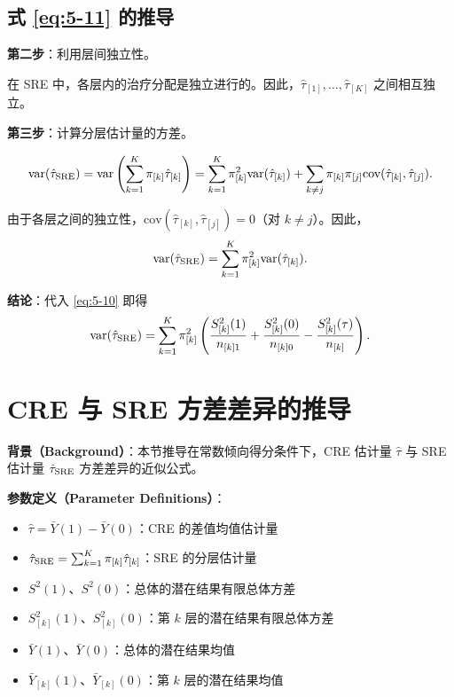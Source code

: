 \subsection*{式 \eqref{eq:5-11} 的推导}

\textbf{第二步}：利用层间独立性。

在 SRE 中，各层内的治疗分配是独立进行的。因此，$\hat{\tau}_{[1]}, \ldots, \hat{\tau}_{[K]}$ 之间相互独立。

\textbf{第三步}：计算分层估计量的方差。

\[
\text{var}(\hat{\tau}_{\text{SRE}}) = \text{var}\left( \sum_{k=1}^K \pi_{[k]} \hat{\tau}_{[k]} \right) = \sum_{k=1}^K \pi_{[k]}^2 \text{var}(\hat{\tau}_{[k]}) + \sum_{k \neq j} \pi_{[k]} \pi_{[j]} \text{cov}(\hat{\tau}_{[k]}, \hat{\tau}_{[j]}).
\]

由于各层之间的独立性，$\text{cov}(\hat{\tau}_{[k]}, \hat{\tau}_{[j]}) = 0$（对 $k \neq j$）。因此，
\[
\text{var}(\hat{\tau}_{\text{SRE}}) = \sum_{k=1}^K \pi_{[k]}^2 \text{var}(\hat{\tau}_{[k]}).
\]

\textbf{结论}：代入 \eqref{eq:5-10} 即得
\[
\text{var}(\hat{\tau}_{\text{SRE}}) = \sum_{k=1}^K \pi_{[k]}^2 \left( \frac{S_{[k]}^2(1)}{n_{[k]1}} + \frac{S_{[k]}^2(0)}{n_{[k]0}} - \frac{S_{[k]}^2(\tau)}{n_{[k]}} \right).
\]

\section{CRE 与 SRE 方差差异的推导}\label{sec:appendix-5-14}

\textbf{背景（Background）}：本节推导在常数倾向得分条件下，CRE 估计量 $\hat{\tau}$ 与 SRE 估计量 $\hat{\tau}_{\text{SRE}}$ 方差差异的近似公式。

\textbf{参数定义（Parameter Definitions）}：
\begin{itemize}
  \item $\hat{\tau} = \bar{Y}(1) - \bar{Y}(0)$：CRE 的差值均值估计量
  \item $\hat{\tau}_{\text{SRE}} = \sum_{k=1}^K \pi_{[k]} \hat{\tau}_{[k]}$：SRE 的分层估计量
  \item $S^2(1)$、$S^2(0)$：总体的潜在结果有限总体方差
  \item $S_{[k]}^2(1)$、$S_{[k]}^2(0)$：第 $k$ 层的潜在结果有限总体方差
  \item $\bar{Y}(1)$、$\bar{Y}(0)$：总体的潜在结果均值
  \item $\bar{Y}_{[k]}(1)$、$\bar{Y}_{[k]}(0)$：第 $k$ 层的潜在结果均值
\end{itemize}

